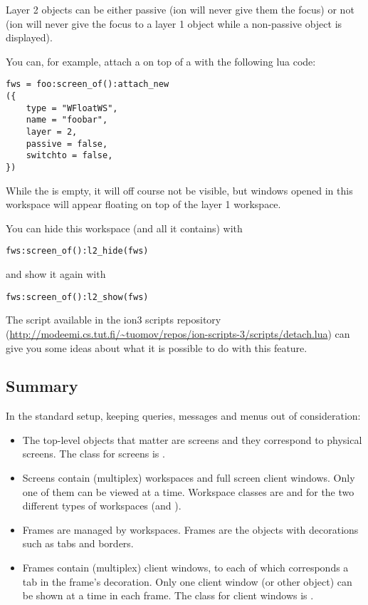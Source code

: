 Layer 2 objects can be either passive (ion will never give them the
focus) or not (ion will never give the focus to a layer 1 object while
a non-passive object is displayed).

You can, for example, attach a  on top of a
 with the following lua code:

\begin{verbatim}
fws = foo:screen_of():attach_new
({
    type = "WFloatWS",
    name = "foobar",
    layer = 2,
    passive = false,
    switchto = false,
})
\end{verbatim}

While the  is empty, it will off course not be visible,
but windows opened in this workspace will appear floating on top of
the layer 1 workspace.

You can hide this workspace (and all it contains) with

\begin{verbatim}
fws:screen_of():l2_hide(fws)
\end{verbatim}

and show it again with

\begin{verbatim}
fws:screen_of():l2_show(fws)
\end{verbatim}

The script  available in the ion3 scripts repository
(\url{http://modeemi.cs.tut.fi/~tuomov/repos/ion-scripts-3/scripts/detach.lua})
can give you some ideas about what it is possible to do with this
feature.



\subsection{Summary}

In the standard setup, keeping queries, messages and menus out of
consideration:

\begin{itemize}
  \item The top-level objects that matter are screens and they correspond
    to physical screens. The class for screens is .
  \item Screens contain (multiplex) workspaces and full screen client
    windows. Only one of them can be viewed at a time.
    Workspace classes are  and  
    for the two different types of workspaces (and ).
  \item Frames are managed by workspaces. Frames are the objects with 
    decorations such as tabs and borders.
  \item Frames contain (multiplex) client windows, to each of which
    corresponds a tab in the frame's decoration. Only one client
    window (or other object) can be shown at a time in each frame.
    The class for client windows is .
\end{itemize}

